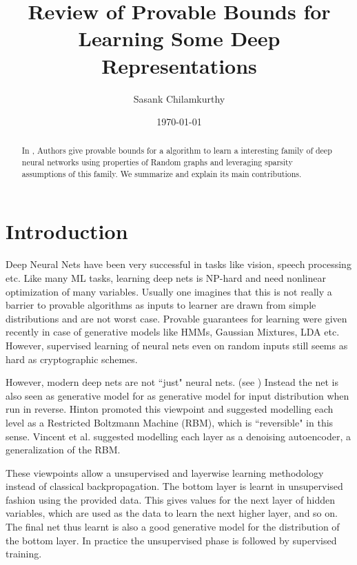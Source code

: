 \documentclass[11pt]{article}
\begin{document}
	\title{Review of Provable Bounds for Learning Some Deep Representations\cite{main}}
	\author{Sasank Chilamkurthy}
	\date{\today}

	\maketitle
	\begin{abstract}
		In \cite{main}, Authors give provable bounds for a algorithm to learn a interesting family of deep neural networks using properties of Random graphs and leveraging sparsity assumptions of this family.
		We summarize \cite{main} and explain its main contributions.
	\end{abstract}
	\section{Introduction}
	Deep Neural Nets have been very successful in tasks like vision, speech processing etc. Like many ML tasks, learning deep nets is NP-hard and need nonlinear optimization of many variables. Usually one imagines that this is not really a barrier to provable algorithms as inputs to learner are drawn from simple distributions and are not worst case. 
	Provable guarantees for learning were given recently in case of generative models like HMMs, Gaussian Mixtures, LDA etc.\cite{hkz12,mv10,hk13,agm12,afh12} However, supervised learning of neural nets even on random inputs still seems as hard as cryptographic schemes.\cite{jks02,ks09}
	
	However, modern deep nets are not ``just" neural nets. (see \cite{ben09})
	Instead the net is also seen as generative model for as generative model for input distribution when run in reverse.
	Hinton promoted this viewpoint and suggested modelling each level as a Restricted Boltzmann Machine (RBM), which is ``reversible" in this sense. 
	Vincent et al. \cite{vlbm08} suggested modelling each layer as a denoising autoencoder, a generalization of the RBM.
	
	These viewpoints allow a unsupervised and layerwise learning methodology instead of classical backpropagation.
	The bottom layer is learnt in unsupervised fashion using the provided data. 
	This gives values for the next layer of hidden variables, which are used as the data to learn the next higher layer, and so on. 
	The final net thus learnt is also a good generative model for the distribution of the bottom layer. 
	In practice the unsupervised phase is followed by supervised training. 
	
\end{document}

